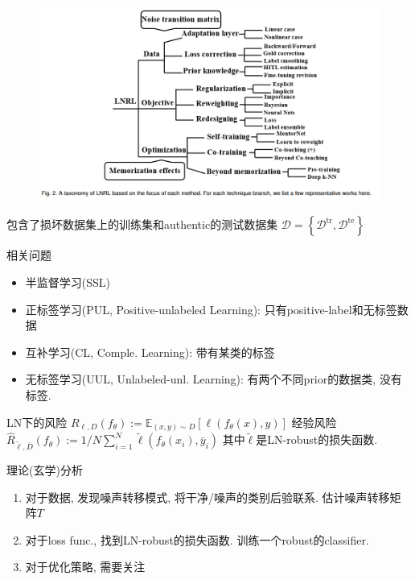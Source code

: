 \documentclass{article}
\begin{document}
\begin{figure}[htbp]
    \centering
    \includegraphics[width=\textwidth]{lnrl-taxo.png}
\end{figure}

包含了损坏数据集上的训练集和authentic的测试数据集
$\mathcal{D}=\left\{\mathcal{D}^{\mathrm{tr}}, \mathcal{D}^{\mathrm{te}}\right\}$



相关问题
\begin{itemize}
    \item 半监督学习(SSL)
    \item 正标签学习(PUL, Positive-unlabeled Learning): 只有positive-label和无标签数据
    \item 互补学习(CL, Comple. Learning): 带有某类的标签
    \item 无标签学习(UUL, Unlabeled-unl. Learning): 有两个不同prior的数据类, 没有标签.
\end{itemize}

LN下的风险
$R_{\ell, D}\left(f_{\theta}\right):=\mathbb{E}_{(x, y) \sim D}\left[\ell\left(f_{\theta}(x), y\right)\right]$
经验风险
$\widehat{R}_{\tilde{\ell}, \bar{D}}\left(f_{\theta}\right):=1 / N \sum_{i=1}^{N} \tilde{\ell}\left(f_{\theta}\left(x_{i}\right), \bar{y}_{i}\right)$
其中$\tilde{\ell}$是LN-robust的损失函数.

理论(玄学)分析
\begin{enumerate}
    \item 对于数据, 发现噪声转移模式, 将干净/噪声的类别后验联系. 估计噪声转移矩阵$T$
    \item 对于loss func., 找到LN-robust的损失函数. 训练一个robust的classifier.
    \item 对于优化策略, 需要关注
\end{enumerate}
\end{document}

